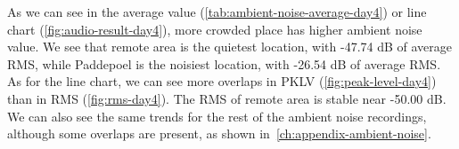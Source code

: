 	As we can see in the average value (\autoref{tab:ambient-noise-average-day4}) or line chart (\autoref{fig:audio-result-day4}), more crowded place has higher ambient noise value. We see that remote area is the quietest location, with -47.74 dB of average \ac{RMS}, while Paddepoel is the noisiest location, with -26.54 dB of average \ac{RMS}. As for the line chart, we can see more overlaps in \ac{PKLV} (\autoref{fig:peak-level-day4}) than in \ac{RMS} (\autoref{fig:rms-day4}). The \ac{RMS} of remote area is stable near -50.00 dB. We can also see the same trends for the rest of the ambient noise recordings, although some overlaps are present, as shown in~\autoref{ch:appendix-ambient-noise}.





